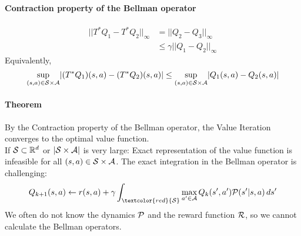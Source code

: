 \documentclass[11pt]{article}
\begin{document}
\paragraph{Contraction property of the Bellman operator}
\begin{align}
	||T^*Q_1 - T^*Q_2 ||_{\infty} &= ||Q_2 - Q_3 ||_{\infty}\\
	 &\leq \gamma||Q_1 - Q_2||_{\infty}
\end{align}
Equivalently,
$$\underset{(s,a)\in \mathcal{S} \times \mathcal{A}}{\sup} |(T^*Q_1)(s,a) - (T^*Q_2)(s,a)| \leq \underset{(s,a)\in \mathcal{S} \times \mathcal{A}}{\sup} |Q_1(s,a) - Q_2(s,a)|$$
\paragraph{Theorem}
By the Contraction property of the Bellman operator, the Value Iteration converges to the optimal value function.\\
 If $\mathcal{S} \subset \mathbb{R}^d$ or $|\mathcal{S} \times \mathcal{A}|$ is very large:
Exact representation of the value function is infeasible for all $(s,a) \in \mathcal{S} \times \mathcal{A}$. The exact integration in the Bellman operator is challenging:
$$Q_{k+1}(s,a) \leftarrow r(s,a) + \gamma\int_{\textcolor{red}{\mc{S}}} \underset{a' \in \mc{A}}{\max}\, Q_k(s',a')\mc{P}(s'|s,a)\, ds'$$
We often do not know the dynamics $\mathcal{P}$ and the reward function $\mathcal{R}$, so we cannot calculate the Bellman operators.
\end{document}
